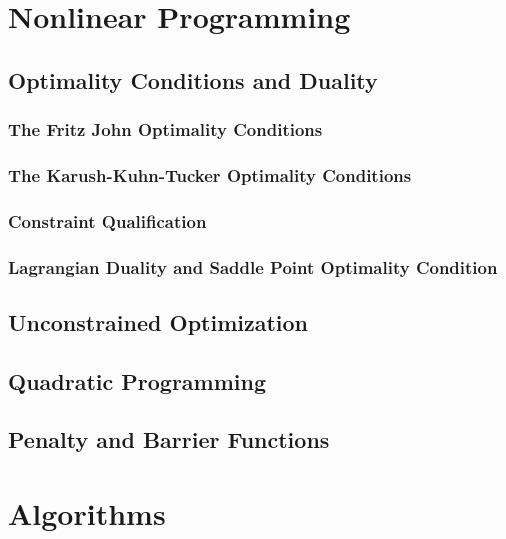 	\part{Nonlinear Programming}\label{Nonlinear}
		\chapter{Optimality Conditions and Duality}
			\section{The Fritz John Optimality Conditions}

			\section{The Karush-Kuhn-Tucker Optimality Conditions}

			\section{Constraint Qualification}

			\section{Lagrangian Duality and Saddle Point Optimality Condition}

		\chapter{Unconstrained Optimization}

		\chapter{Quadratic Programming}

		\chapter{Penalty and Barrier Functions}

	\part{Algorithms}\label{Algo}
